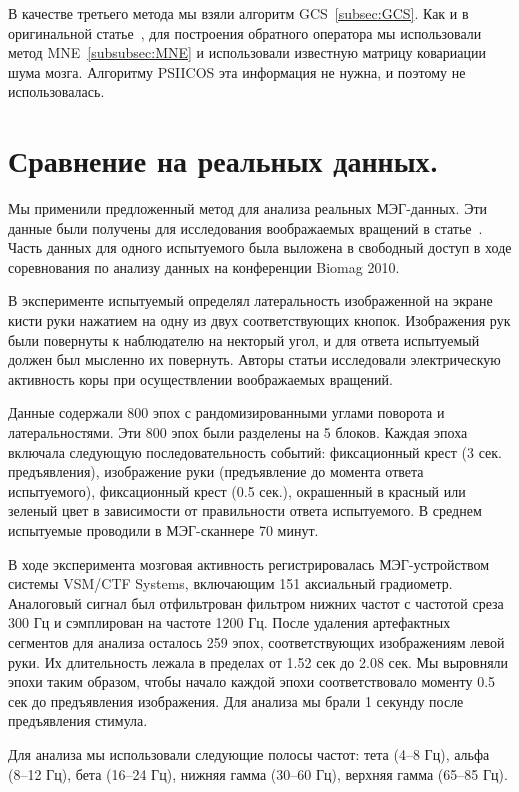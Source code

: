 В качестве третьего метода мы взяли алгоритм GCS~\ref{subsec:GCS}.
Как и в оригинальной статье~\cite{Wens2015}, для построения обратного оператора
мы использовали метод MNE~\ref{subsubsec:MNE} и использовали известную матрицу
ковариации шума мозга. Алгоритму PSIICOS эта информация не нужна, и поэтому не использовалась.

\section{Сравнение на реальных данных.}\label{sec:validation_on_real_data}

Мы применили предложенный метод для анализа реальных МЭГ-данных. Эти данные были получены
для исследования воображаемых вращений в статье~\cite{DeLange2008}. Часть данных
для одного испытуемого была выложена в свободный доступ в ходе соревнования
по анализу данных на конференции Biomag 2010.

В эксперименте испытуемый определял латеральность изображенной на экране кисти
руки нажатием на одну из двух соответствующих кнопок.
Изображения рук были повернуты к наблюдателю на некторый угол, и для ответа испытуемый
должен был мысленно их повернуть. Авторы статьи исследовали электрическую активность
коры при осуществлении воображаемых вращений.

Данные содержали 800 эпох с рандомизированными углами поворота и латеральностями. Эти
800 эпох были разделены на 5 блоков. Каждая эпоха включала следующую последовательность
событий: фиксационный крест (3 сек. предъявления), изображение руки (предъявление до момента
ответа испытуемого), фиксационный крест (0.5 сек.), окрашенный в красный или зеленый
цвет в зависимости от правильности ответа испытуемого. В среднем испытуемые проводили
в МЭГ-сканнере 70 минут.

В ходе эксперимента мозговая активность регистрировалась МЭГ-устройством
системы VSM/CTF Systems, включающим 151 аксиальный градиометр. Аналоговый
сигнал был отфильтрован  фильтром нижних частот с частотой среза 300 Гц и сэмплирован на
частоте 1200 Гц. После удаления артефактных сегментов для анализа осталось 259 эпох,
соответствующих изображениям левой руки. Их длительность лежала в пределах
от 1.52 сек до 2.08 сек. Мы выровняли эпохи таким образом, чтобы начало каждой эпохи
соответствовало моменту 0.5 сек до предъявления изображения. Для анализа мы брали 1 секунду
после предъявления стимула.

Для анализа мы использовали следующие полосы частот: тета (4--8 Гц), альфа (8--12 Гц), бета
(16--24 Гц), нижняя гамма (30--60 Гц), верхняя гамма (65--85 Гц).


